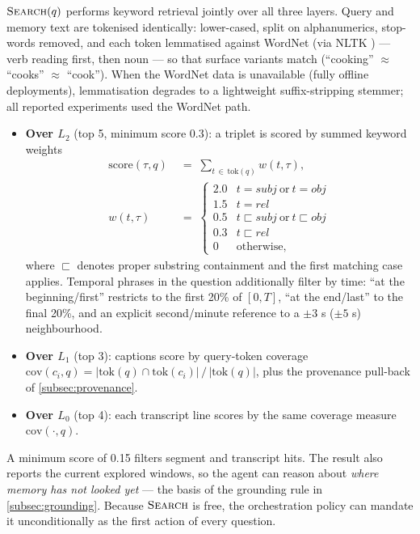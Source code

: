 $\textsc{Search}(q)$ performs keyword retrieval jointly over all three layers. Query and memory
text are tokenised identically: lower-cased, split on alphanumerics, stop-words removed, and each
token lemmatised against WordNet \cite{miller1995wordnet} (via NLTK \cite{bird2009nltk}) --- verb reading
first, then noun --- so that surface variants match (``cooking'' $\approx$ ``cooks'' $\approx$ ``cook''). When the
WordNet data is unavailable (fully offline deployments), lemmatisation degrades to a lightweight
suffix-stripping stemmer; all reported experiments used the WordNet path.

\begin{itemize}
  \item \textbf{Over $L_2$} (top 5, minimum score 0.3): a triplet is scored by summed keyword weights
  \begin{equation}
  \label{eq:score}
  \begin{aligned}
  \mathrm{score}(\tau, q) &\;=\; \sum_{t \,\in\, \mathrm{tok}(q)} w(t, \tau), \\[2pt]
  w(t, \tau) &\;=\; \begin{cases}
  2.0 & t = \mathit{subj} \ \text{or}\ t = \mathit{obj} \\
  1.5 & t = \mathit{rel} \\
  0.5 & t \sqsubset \mathit{subj} \ \text{or}\ t \sqsubset \mathit{obj} \\
  0.3 & t \sqsubset \mathit{rel} \\
  0 & \text{otherwise,}
  \end{cases}
  \end{aligned}
  \end{equation}
  where $\sqsubset$ denotes proper substring containment and the first matching case applies.
  Temporal phrases in the question additionally filter by time: ``at the beginning/first''
  restricts to the first 20\% of $[0,T]$, ``at the end/last'' to the final 20\%, and an explicit
  second/minute reference to a $\pm 3$ s ($\pm 5$ s) neighbourhood.
  \item \textbf{Over $L_1$} (top 3): captions score by query-token coverage
  $\mathrm{cov}(c_i, q) = |\mathrm{tok}(q) \cap \mathrm{tok}(c_i)| \,/\, |\mathrm{tok}(q)|$,
  plus the provenance pull-back of \cref{subsec:provenance}.
  \item \textbf{Over $L_0$} (top 4): each transcript line scores by the same coverage measure
  $\mathrm{cov}(\cdot, q)$.
\end{itemize}

A minimum score of 0.15 filters segment and transcript hits. The result also reports the current
explored windows, so the agent can reason about \emph{where memory has not looked yet} --- the basis of
the grounding rule in \cref{subsec:grounding}. Because $\textsc{Search}$ is free, the orchestration policy can
mandate it unconditionally as the first action of every question.

